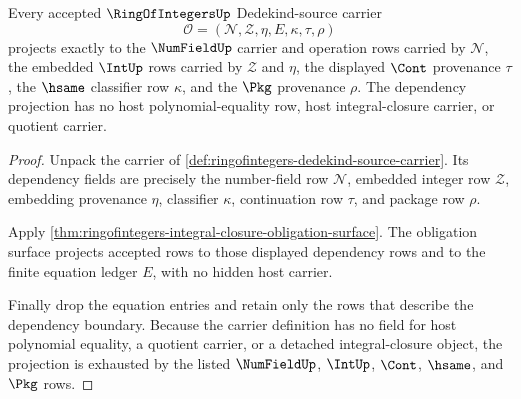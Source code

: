\begin{theorem}
\label{thm:ringofintegers-dependency-projection-boundary}
Every accepted $\RingOfIntegersUp$ Dedekind-source carrier
$$
\mathcal O=(\mathcal N,\mathcal Z,\eta,E,\kappa,\tau,\rho)
$$
projects exactly to the $\NumFieldUp$ carrier and operation rows carried by
$\mathcal N$, the embedded $\IntUp$ rows carried by $\mathcal Z$ and $\eta$,
the displayed $\Cont$ provenance $\tau$, the $\hsame$ classifier row $\kappa$,
and the $\Pkg$ provenance $\rho$. The dependency projection has no host
polynomial-equality row, host integral-closure carrier, or quotient carrier.
\end{theorem}
\begin{proof}
Unpack the carrier of
\autoref{def:ringofintegers-dedekind-source-carrier}. Its dependency fields are
precisely the number-field row $\mathcal N$, embedded integer row
$\mathcal Z$, embedding provenance $\eta$, classifier $\kappa$, continuation
row $\tau$, and package row $\rho$.

Apply \autoref{thm:ringofintegers-integral-closure-obligation-surface}. The
obligation surface projects accepted rows to those displayed dependency rows
and to the finite equation ledger $E$, with no hidden host carrier.

Finally drop the equation entries and retain only the rows that describe the
dependency boundary. Because the carrier definition has no field for host
polynomial equality, a quotient carrier, or a detached integral-closure object,
the projection is exhausted by the listed $\NumFieldUp$, $\IntUp$, $\Cont$,
$\hsame$, and $\Pkg$ rows.
\end{proof}

